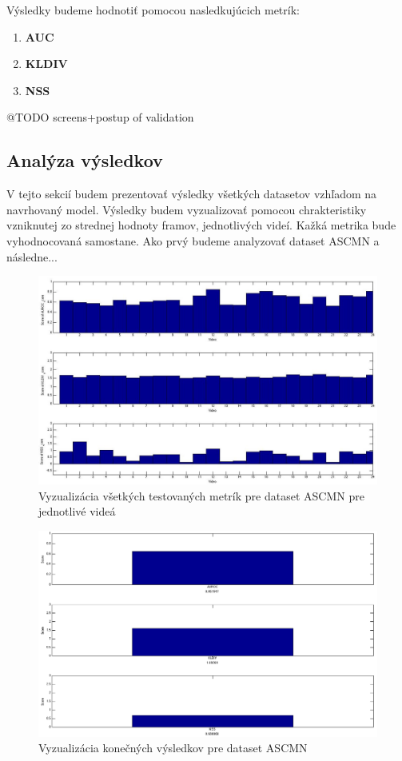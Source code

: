 Výsledky budeme hodnotiť pomocou nasledkujúcich metrík:
\begin{enumerate}
  \item\textbf{AUC\cite{metrics-1}}
  \item\textbf{KLDIV\cite{metrics-1}}
  \item\textbf{NSS\cite{metrics-1}}
\end{enumerate}

@TODO screens+postup of validation

\clearpage

\subsection{Analýza výsledkov}
V tejto sekcií budem prezentovať výsledky všetkých datasetov vzhľadom na navrhovaný model.
Výsledky budem vyzualizovať pomocou chrakteristiky vzniknutej zo strednej hodnoty framov, jednotlivých videí.
Kažká metrika bude vyhodnocovaná samostane. Ako prvý budeme analyzovať dataset ASCMN\cite{accv} a následne...

\begin{figure}[H]
  \includegraphics[angle=90, width=15cm]{pics/single-accv.jpg}
  \caption{Vyzualizácia všetkých testovaných metrík pre dataset ASCMN\cite{accv} pre jednotlivé videá}
  \label{fig:ASCMN1}
\end{figure}

\begin{figure}[H]
  \includegraphics[width=15cm]{pics/single-mean-accv.png}
  \caption{Vyzualizácia konečných výsledkov pre dataset ASCMN\cite{accv}}
  \label{fig:ASCMN2}
\end{figure}


